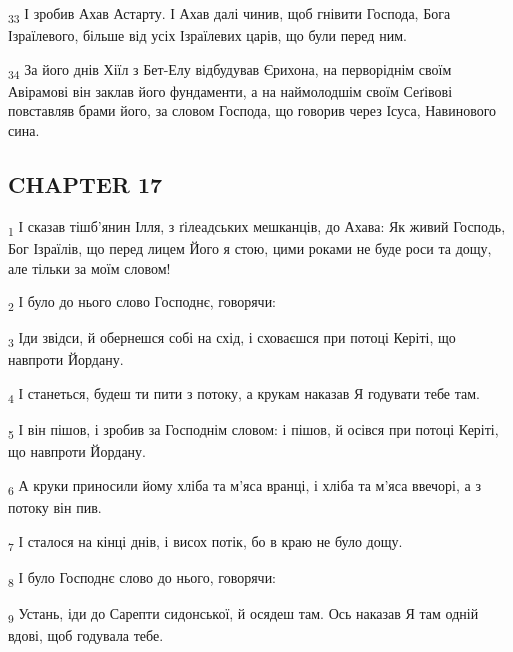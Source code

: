 \begin{tcolorbox}
\textsubscript{33} І зробив Ахав Астарту. І Ахав далі чинив, щоб гнівити Господа, Бога Ізраїлевого, більше від усіх Ізраїлевих царів, що були перед ним.
\end{tcolorbox}
\begin{tcolorbox}
\textsubscript{34} За його днів Хіїл з Бет-Елу відбудував Єрихона, на перворіднім своїм Авірамові він заклав його фундаменти, а на наймолодшім своїм Сеґівові повставляв брами його, за словом Господа, що говорив через Ісуса, Навинового сина.
\end{tcolorbox}
\subsection{CHAPTER 17}
\begin{tcolorbox}
\textsubscript{1} І сказав тішб'янин Ілля, з ґілеадських мешканців, до Ахава: Як живий Господь, Бог Ізраїлів, що перед лицем Його я стою, цими роками не буде роси та дощу, але тільки за моїм словом!
\end{tcolorbox}
\begin{tcolorbox}
\textsubscript{2} І було до нього слово Господнє, говорячи:
\end{tcolorbox}
\begin{tcolorbox}
\textsubscript{3} Іди звідси, й обернешся собі на схід, і сховаєшся при потоці Керіті, що навпроти Йордану.
\end{tcolorbox}
\begin{tcolorbox}
\textsubscript{4} І станеться, будеш ти пити з потоку, а крукам наказав Я годувати тебе там.
\end{tcolorbox}
\begin{tcolorbox}
\textsubscript{5} І він пішов, і зробив за Господнім словом: і пішов, й осівся при потоці Керіті, що навпроти Йордану.
\end{tcolorbox}
\begin{tcolorbox}
\textsubscript{6} А круки приносили йому хліба та м'яса вранці, і хліба та м'яса ввечорі, а з потоку він пив.
\end{tcolorbox}
\begin{tcolorbox}
\textsubscript{7} І сталося на кінці днів, і висох потік, бо в краю не було дощу.
\end{tcolorbox}
\begin{tcolorbox}
\textsubscript{8} І було Господнє слово до нього, говорячи:
\end{tcolorbox}
\begin{tcolorbox}
\textsubscript{9} Устань, іди до Сарепти сидонської, й осядеш там. Ось наказав Я там одній вдові, щоб годувала тебе.
\end{tcolorbox}
